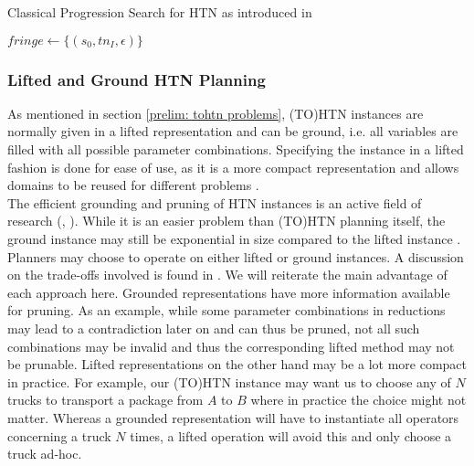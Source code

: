 \begin{algorithm}
	\caption{Classical Progression Search for HTN as introduced in \cite{holler2020htn}}
	\label{algo: progression search}
	$fringe \gets \{ (s_0, tn_I, \epsilon)\}$\;
\end{algorithm}

\subsubsection{Lifted and Ground HTN Planning}
As mentioned in section \ref{prelim: tohtn problems}, (TO)HTN instances are normally given in a lifted representation and can be ground, i.e. all variables are filled with all possible parameter combinations. Specifying the instance in a lifted fashion is done for ease of use, as it is a more compact representation and allows domains to be reused for different problems \cite{behnke2020succinct}. \\
The efficient grounding and pruning of HTN instances is an active field of research (\cite{ramoul2017grounding}, \cite{behnke2020succinct}). While it is an easier problem than (TO)HTN planning itself, the ground instance may still be exponential in size compared to the lifted instance \cite{behnke2020succinct}. \\
Planners may choose to operate on either lifted or ground instances. A discussion on the trade-offs involved is found in \cite{schreiber2021lilotane}. We will reiterate the main advantage of each approach here. Grounded representations have more information available for pruning. As an example, while some parameter combinations in reductions may lead to a contradiction later on and can thus be pruned, not all such combinations may be invalid and thus the corresponding lifted method may not be prunable. Lifted representations on the other hand may be a lot more compact in practice. For example, our (TO)HTN instance may want us to choose any of $N$ trucks to transport a package from $A$ to $B$ where in practice the choice might not matter. Whereas a grounded representation will have to instantiate all operators concerning a truck $N$ times, a lifted operation will avoid this and only choose a truck ad-hoc. \\
